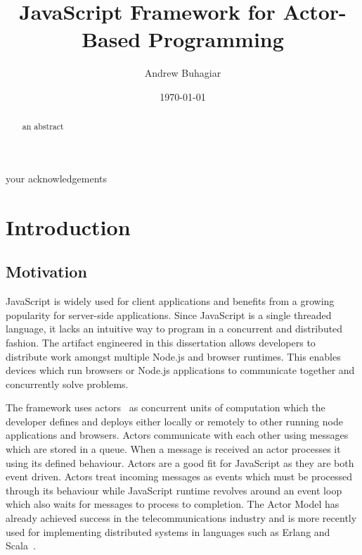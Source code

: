 \documentclass[12pt, a4paper]{report}
\theoremstyle{definition}
\theoremstyle{definition}%
\theoremstyle{definition}%
\theoremstyle{definition}%
\theoremstyle{definition}%
\theoremstyle{definition}%
\begin{document}
\title{JavaScript Framework for Actor-Based Programming}
\author{Andrew Buhagiar}
\date{\today}

\frontmatter


\begin{acknowledgements}
your acknowledgements
\end{acknowledgements}
       
\begin{abstract}
an abstract
\end{abstract}

\tableofcontents

\listoffigures

\listoftables



\mainmatter

\chapter{Introduction}
\section{Motivation}
JavaScript is widely used for client applications and benefits from a growing popularity for server-side applications. Since JavaScript is a single threaded language, it lacks an intuitive way to program in a concurrent and distributed fashion. The artifact engineered in this dissertation allows developers to distribute work amongst multiple Node.js and browser runtimes. This enables devices which run browsers or Node.js applications to communicate together and concurrently solve problems.

The framework uses actors~\cite{hewitt1973session}\cite{43years} as concurrent units of computation which the developer defines and deploys either locally or remotely to other running node applications and browsers. Actors communicate with each other using messages which are stored in a queue. When a message is received an actor processes it using its defined behaviour. Actors are a good fit for JavaScript as they are both event driven. Actors treat incoming messages as events which must be processed through its behaviour while JavaScript runtime revolves around an event loop which also waits for messages to process to completion. The Actor Model has already achieved success in the telecommunications industry and is more recently used for implementing distributed systems in languages such as Erlang and Scala~\cite{haller2012integration}.
\end{document}
